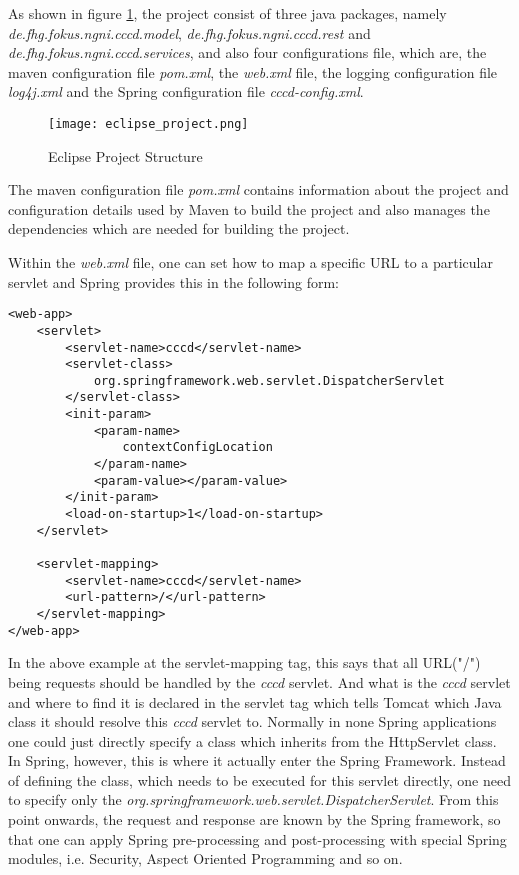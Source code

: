 As shown in figure \ref{fig:eclipse_project}, the project consist of three java packages, namely \textit{de.fhg.fokus.ngni.cccd.model}, 	\textit{de.fhg.fokus.ngni.cccd.rest} and \textit{de.fhg.fokus.ngni.cccd.services}, and also four configurations file, which are, the maven configuration file \textit{pom.xml}, the \textit{web.xml} file, the logging configuration file \textit{log4j.xml} and the Spring configuration file \textit{cccd-config.xml}.

\begin{figure}[htb]
  \centering
  \texttt{[image: eclipse\_project.png]}\\
  \caption{Eclipse Project Structure}
  \label{fig:eclipse_project}
\end{figure}

\pagebreak

The maven configuration file \textit{pom.xml} contains information about the project and configuration details used by Maven to build the project and also manages the dependencies which are needed for building the project.

Within the \textit{web.xml} file, one can set how to map a specific URL to a particular servlet and Spring provides this in the following form:

\begin{code}
\begin{verbatim}
<web-app>
	<servlet>
		<servlet-name>cccd</servlet-name>
		<servlet-class>
			org.springframework.web.servlet.DispatcherServlet
		</servlet-class>
		<init-param>
			<param-name>
				contextConfigLocation
			</param-name>
			<param-value></param-value>
		</init-param>
		<load-on-startup>1</load-on-startup>
	</servlet>

	<servlet-mapping>
		<servlet-name>cccd</servlet-name>
		<url-pattern>/</url-pattern>
	</servlet-mapping>
</web-app>
\end{verbatim}
\end{code}

In the above example at the servlet-mapping tag, this says that all URL("/") being requests should be handled by the \textit{cccd} servlet.  And what is the \textit{cccd} servlet and where to find it is declared in the servlet tag which tells Tomcat which Java class it should resolve this \textit{cccd} servlet to. Normally in none Spring applications one could just directly specify a class which inherits from the HttpServlet class. In Spring, however, this is where it actually enter the Spring Framework.  Instead of defining the class, which needs to be executed for this servlet directly, one need to specify only the \textit{org.springframework.web.servlet.DispatcherServlet}. From this point onwards, the request and response are known by the Spring framework, so that one can apply Spring pre-processing and post-processing with special Spring modules, i.e. Security, Aspect Oriented Programming and so on.

